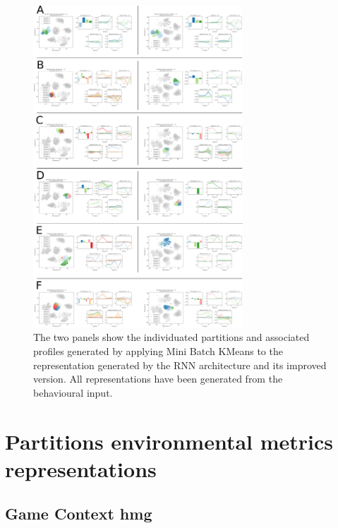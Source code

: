 \begin{figure}[ht]
\includegraphics[width=0.7\textwidth]{images/appendix_D/clust_beha_all.png}
\centering
\caption[Partitions of the representations generated by the RNN architecture and its improved version from the behavioural metrics]{The two panels show the individuated partitions and associated profiles generated by applying Mini Batch KMeans to the representation generated by the RNN architecture and its improved version. All representations have been generated from the behavioural input.}
\label{partition_rnn_behaviour} 
\end{figure}
\FloatBarrier

\section{Partitions environmental metrics representations}
\label{partitions_environmental}

\subsection{Game Context hmg}
\label{env_clust_hmg}

